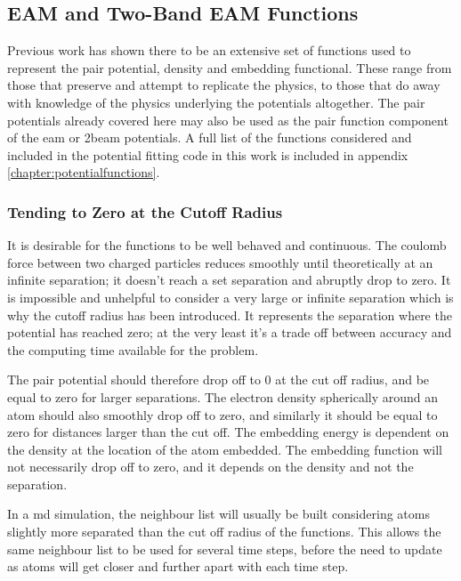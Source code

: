 \subsection{EAM and Two-Band EAM Functions}

Previous work has shown there to be an extensive set of functions used to represent the pair potential, density and embedding functional.  These range from those that preserve and attempt to replicate the physics, to those that do away with knowledge of the physics underlying the potentials altogether.  The pair potentials already covered here may also be used as the pair function component of the \acrshort{eam} or \acrshort{2beam} potentials.  A full list of the functions considered and included in the potential fitting code in this work is included in appendix \ref{chapter:potentialfunctions}.




\subsubsection{Tending to Zero at the Cutoff Radius}
\label{section:tendingtozero}

It is desirable for the functions to be well behaved and continuous.  The coulomb force between two charged particles reduces smoothly until theoretically at an infinite separation; it doesn't reach a set separation and abruptly drop to zero.  It is impossible and unhelpful to consider a very large or infinite separation which is why the cutoff radius has been introduced.  It represents the separation where the potential has reached zero; at the very least it's a trade off between accuracy and the computing time available for the problem.

The pair potential should therefore drop off to 0 at the cut off radius, and be equal to zero for larger separations.  The electron density spherically around an atom should also smoothly drop off to zero, and similarly it should be equal to zero for distances larger than the cut off.  The embedding energy is dependent on the density at the location of the atom embedded.  The embedding function will not necessarily drop off to zero, and it depends on the density and not the separation.

In a \acrshort{md} simulation, the neighbour list will usually be built considering atoms slightly more separated than the cut off radius of the functions.  This allows the same neighbour list to be used for several time steps, before the need to update as atoms will get closer and further apart with each time step.  



